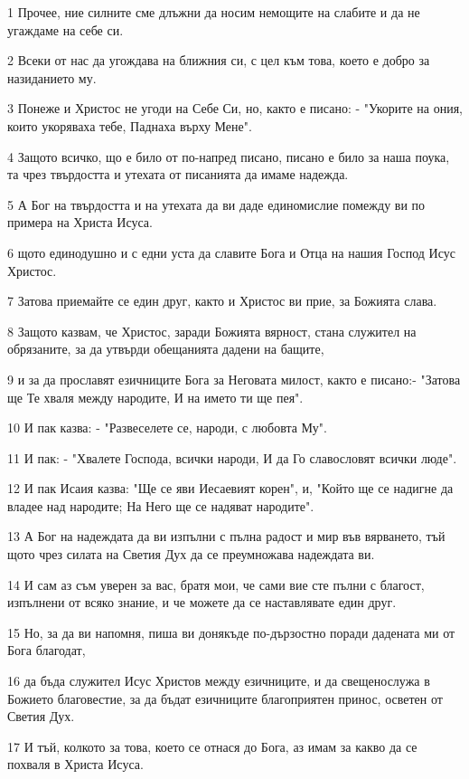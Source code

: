 \par 1 Прочее, ние силните сме длъжни да носим немощите на слабите и да не угаждаме на себе си.
\par 2 Всеки от нас да угождава на ближния си, с цел към това, което е добро за назиданието му.
\par 3 Понеже и Христос не угоди на Себе Си, но, както е писано: - "Укорите на ония, които укоряваха тебе, Паднаха върху Мене".
\par 4 Защото всичко, що е било от по-напред писано, писано е било за наша поука, та чрез твърдостта и утехата от писанията да имаме надежда.
\par 5 А Бог на твърдостта и на утехата да ви даде единомислие помежду ви по примера на Христа Исуса.
\par 6 щото единодушно и с едни уста да славите Бога и Отца на нашия Господ Исус Христос.
\par 7 Затова приемайте се един друг, както и Христос ви прие, за Божията слава.
\par 8 Защото казвам, че Христос, заради Божията вярност, стана служител на обрязаните, за да утвърди обещанията дадени на бащите,
\par 9 и за да прославят езичниците Бога за Неговата милост, както е писано:- "Затова ще Те хваля между народите, И на името ти ще пея".
\par 10 И пак казва: - "Развеселете се, народи, с любовта Му".
\par 11 И пак: - "Хвалете Господа, всички народи, И да Го славословят всички люде".
\par 12 И пак Исаия казва: "Ще се яви Иесаевият корен", и, "Който ще се надигне да владее над народите; На Него ще се надяват народите".
\par 13 А Бог на надеждата да ви изпълни с пълна радост и мир във вярването, тъй щото чрез силата на Светия Дух да се преумножава надеждата ви.
\par 14 И сам аз съм уверен за вас, братя мои, че сами вие сте пълни с благост, изпълнени от всяко знание, и че можете да се наставлявате един друг.
\par 15 Но, за да ви напомня, пиша ви донякъде по-дързостно поради дадената ми от Бога благодат,
\par 16 да бъда служител Исус Христов между езичниците, и да свещенослужа в Божието благовестие, за да бъдат езичниците благоприятен принос, осветен от Светия Дух.
\par 17 И тъй, колкото за това, което се отнася до Бога, аз имам за какво да се похваля в Христа Исуса.
